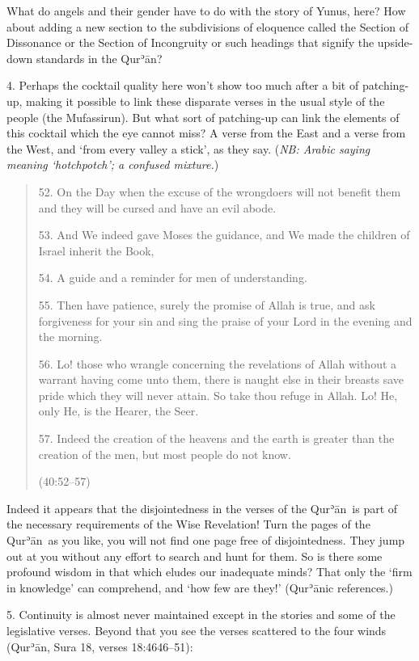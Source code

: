\documentclass[12pt]{memoir}
\def\´{ʾ} %
\def \Quran{Qur\-\´ān} %
\def\–{-\hskip0pt}
\newcommand{\QRef}[1]{{\color{darkblue}#1}}
\newcommand{\NB}[1]{\emph{\small NB: #1}}
\begin{document}
What do angels and their gender have to do with the story of Yunus, here?
How about adding a new section to the subdivisions of eloquence
called the Section of Dissonance or the Section of Incongruity
or such headings that signify the upside\–down standards in the \Quran?

4. Perhaps the cocktail quality here won’t show too much
after a bit of patching\–up,
making it possible to link these disparate verses
in the usual style of the people (the Mufassirun).
But what sort of patching\–up can link the elements of this cocktail
which the eye cannot miss?
A verse from the East and a verse from the West,
and ‘from every valley a stick’, as they say.
(\NB{Arabic saying meaning ‘hotchpotch’; a confused mixture.})

\begin{quote}
52. On the Day when the excuse of the wrongdoers will not benefit them
and they will be cursed and have an evil abode.

53. And We indeed gave Moses the guidance,
and We made the children of Israel inherit the Book,

54. A guide and a reminder for men of understanding.

55. Then have patience, surely the promise of Allah is true,
and ask forgiveness for your sin and sing the praise of your Lord
in the evening and the morning.

56. Lo! those who wrangle concerning the revelations of Allah
without a warrant having come unto them,
there is naught else in their breasts save pride which they will never attain.
So take thou refuge in Allah.
Lo! He, only He, is the Hearer, the Seer.

57. Indeed the creation of the heavens and the earth is greater
than the creation of the men, but most people do not know.

(\QRef{40:52–57})
\end{quote}

Indeed it appears that the disjointedness in the verses of the \Quran\
is part of the necessary requirements of the Wise Revelation!
Turn the pages of the \Quran\ as you like,
you will not find one page free of disjointedness.
They jump out at you without any effort to search and hunt for them.
So is there some profound wisdom in that which eludes our inadequate minds?
That only the ‘firm in knowledge’ can comprehend, and ‘how few are they!’
(\Quran{}ic references.)

5. Continuity is almost never maintained except in the stories
and some of the legislative verses.
Beyond that you see the verses scattered to the four winds
(\Quran, Sura \QRef{18}, verses \QRef{18:46}{46–51}):
\end{document}
